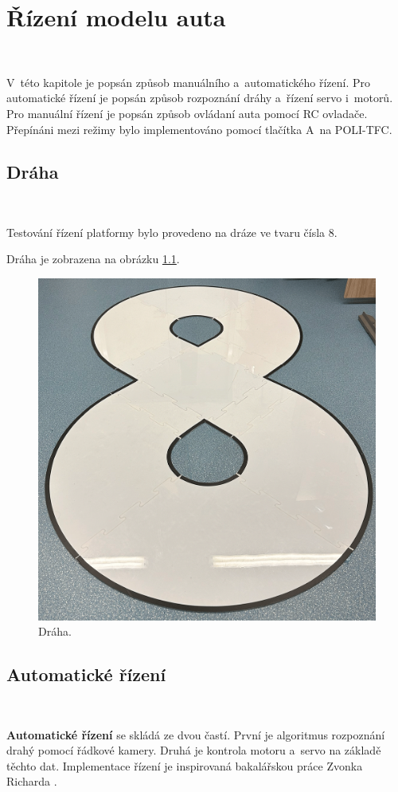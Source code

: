 \chapter{Řízení modelu auta}
\label{sec:PlatformControl}\

V~této kapitole je popsán způsob manuálního a~automatického řízení. Pro automatické
řízení je popsán způsob rozpoznání dráhy a~řízení servo i~motorů. Pro manuální
řízení je popsán způsob ovládaní auta pomocí RC ovladače. Přepínáni mezi režimy
bylo implementováno pomocí tlačítka A~na POLI-TFC.


\section{Dráha}\

Testování řízení platformy bylo provedeno na dráze ve tvaru čísla 8.

Dráha je zobrazena na obrázku \ref{fig:Road}.

\begin{figure}[!h]
    \centering
    \includegraphics[width = .55\linewidth]{Figures/Road.png}
    \caption{Dráha.}
    \label{fig:Road}
    \vspace{-15pt}
\end{figure}

\section{Automatické řízení}\

\textbf{Automatické řízení} se skládá ze dvou častí. První je algoritmus rozpoznání 
drahý pomocí řádkové kamery. Druhá je kontrola motoru a~servo na základě těchto dat. 
Implementace řízení je inspirovaná bakalářskou práce Zvonka Richarda  \cite{robot}.

